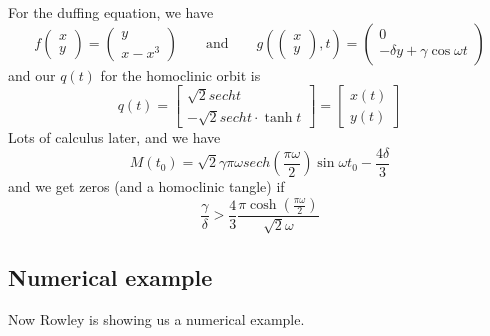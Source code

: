 \documentclass{article}
\begin{document}
For the duffing equation, we have 
\[
f\begin{pmatrix}
    x \\ y
\end{pmatrix}=\begin{pmatrix}
    y \\ x-x^3
\end{pmatrix} \qquad \text{and} \qquad g\left(\begin{pmatrix}
    x \\ y
\end{pmatrix},t\right)=\begin{pmatrix}
    0 \\ -\delta y + \gamma \cos \omega t
\end{pmatrix}
\]
and our $q(t)$ for the homoclinic orbit is 
\[
q(t) = \begin{bmatrix}
    \sqrt{2} sech t \\ -\sqrt{2} sech t \cdot \tanh t
\end{bmatrix}= \begin{bmatrix}
    x(t) \\ y(t)
\end{bmatrix}
\]
Lots of calculus later, and we have 
\[
M(t_0) = \sqrt{2} \gamma \pi \omega sech\left(\frac{\pi \omega}{2}\right)\sin \omega t_0 - \frac{4 \delta }{3}
\]
and we get zeros (and a homoclinic tangle) if 
\[
\frac{\gamma}{\delta} > \frac{4}{3} \frac{\pi \cosh \left(\frac{\pi\omega}{2}\right)}{\sqrt{2} \omega}
\]

\subsection{Numerical example}

Now Rowley is showing us a numerical example.
\end{document}
